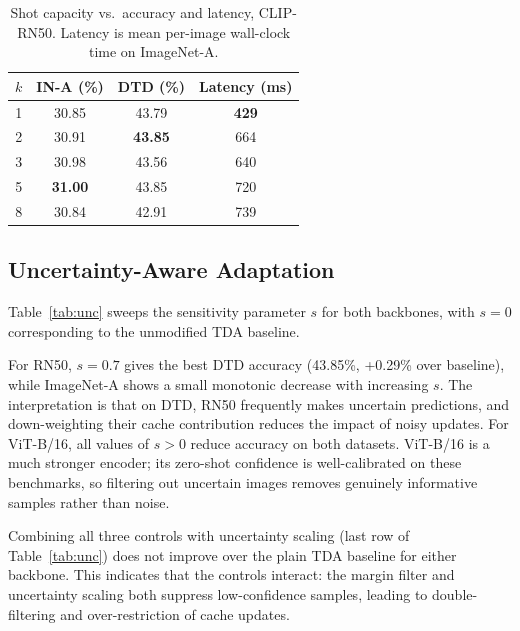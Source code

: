 \documentclass[10pt,twocolumn,letterpaper]{article}
\newcommand{\best}[1]{\textbf{#1}}
\begin{document}
\begin{table}[t]
\centering\small\setlength{\tabcolsep}{5pt}
\caption{Shot capacity vs.\ accuracy and latency, CLIP-RN50.
  Latency is mean per-image wall-clock time on ImageNet-A.}
\label{tab:capacity}
\begin{tabular}{cccc}
\toprule
$k$ & IN-A (\%) & DTD (\%) & Latency (ms) \\
\midrule
1 & 30.85 & 43.79          & \best{429} \\
2 & 30.91 & \best{43.85}   & 664 \\
3 & 30.98 & 43.56          & 640 \\
5 & \best{31.00} & 43.85   & 720 \\
8 & 30.84 & 42.91          & 739 \\
\bottomrule
\end{tabular}
\end{table}

\subsection{Uncertainty-Aware Adaptation}
\label{subsec:unc}

Table~\ref{tab:unc} sweeps the sensitivity parameter $s$ for both
backbones, with $s{=}0$ corresponding to the unmodified TDA baseline.

For RN50, $s{=}0.7$ gives the best DTD accuracy (43.85\%,
+0.29\% over baseline), while ImageNet-A shows a small monotonic
decrease with increasing $s$.
The interpretation is that on DTD, RN50 frequently makes uncertain
predictions, and down-weighting their cache contribution reduces the
impact of noisy updates.
For ViT-B/16, all values of $s{>}0$ reduce accuracy on both
datasets.
ViT-B/16 is a much stronger encoder; its zero-shot confidence is
well-calibrated on these benchmarks, so filtering out uncertain images
removes genuinely informative samples rather than noise.

Combining all three controls with uncertainty scaling (last row of
Table~\ref{tab:unc}) does not improve over the plain TDA baseline
for either backbone.
This indicates that the controls interact: the margin filter and
uncertainty scaling both suppress low-confidence samples, leading
to double-filtering and over-restriction of cache updates.
\end{document}
